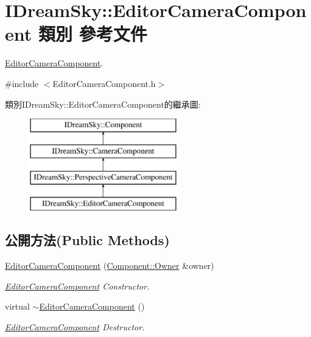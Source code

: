 \hypertarget{class_i_dream_sky_1_1_editor_camera_component}{}\section{I\+Dream\+Sky\+:\+:Editor\+Camera\+Component 類別 參考文件}
\label{class_i_dream_sky_1_1_editor_camera_component}


\hyperlink{class_i_dream_sky_1_1_editor_camera_component}{Editor\+Camera\+Component}.  




{\ttfamily \#include $<$Editor\+Camera\+Component.\+h$>$}

類別\+I\+Dream\+Sky\+:\+:Editor\+Camera\+Component的繼承圖\+:\begin{figure}[H]
\begin{center}
\leavevmode
\includegraphics[height=4.000000cm]{class_i_dream_sky_1_1_editor_camera_component}
\end{center}
\end{figure}
\subsection*{公開方法(Public Methods)}
\begin{DoxyCompactItemize}
\item 
\hyperlink{class_i_dream_sky_1_1_editor_camera_component_ae1825046473d07250ca75e000442c206}{Editor\+Camera\+Component} (\hyperlink{class_i_dream_sky_1_1_component_1_1_owner}{Component\+::\+Owner} \&owner)
\begin{DoxyCompactList}\small\item\em \hyperlink{class_i_dream_sky_1_1_editor_camera_component}{Editor\+Camera\+Component} Constructor. \end{DoxyCompactList}\item 
virtual \hyperlink{class_i_dream_sky_1_1_editor_camera_component_a25a0c9cdfa8ba1bb7aef1fc69435ab9f}{$\sim$\+Editor\+Camera\+Component} ()
\begin{DoxyCompactList}\small\item\em \hyperlink{class_i_dream_sky_1_1_editor_camera_component}{Editor\+Camera\+Component} Destructor. \end{DoxyCompactList}\end{DoxyCompactItemize}

